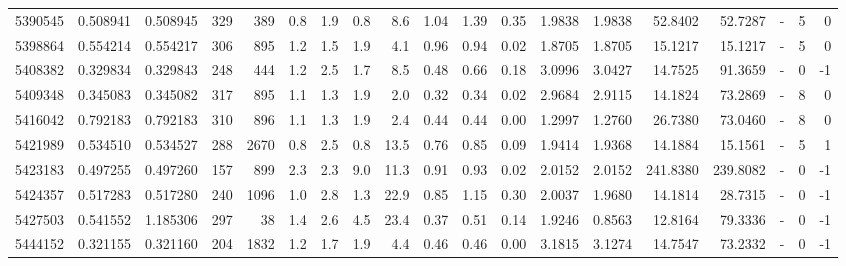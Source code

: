 \begin{tabular}{rrrrrrrrrrrrrrrrlrr}
   5390545 & 0.508941 &   0.508945 &  329 &  389 &      0.8 &      1.9 &     0.8 &      8.6 &       1.04 &        1.39 &        0.35 &  1.9838 &  1.9838 &   52.8402 &   52.7287 &             - &        5 &          0 \\
   5398864 & 0.554214 &   0.554217 &  306 &  895 &      1.2 &      1.5 &     1.9 &      4.1 &       0.96 &        0.94 &        0.02 &  1.8705 &  1.8705 &   15.1217 &   15.1217 &             - &        5 &          0 \\
   5408382 & 0.329834 &   0.329843 &  248 &  444 &      1.2 &      2.5 &     1.7 &      8.5 &       0.48 &        0.66 &        0.18 &  3.0996 &  3.0427 &   14.7525 &   91.3659 &             - &        0 &         -1 \\
   5409348 & 0.345083 &   0.345082 &  317 &  895 &      1.1 &      1.3 &     1.9 &      2.0 &       0.32 &        0.34 &        0.02 &  2.9684 &  2.9115 &   14.1824 &   73.2869 &             - &        8 &          0 \\
   5416042 & 0.792183 &   0.792183 &  310 &  896 &      1.1 &      1.3 &     1.9 &      2.4 &       0.44 &        0.44 &        0.00 &  1.2997 &  1.2760 &   26.7380 &   73.0460 &             - &        8 &          0 \\
   5421989 & 0.534510 &   0.534527 &  288 & 2670 &      0.8 &      2.5 &     0.8 &     13.5 &       0.76 &        0.85 &        0.09 &  1.9414 &  1.9368 &   14.1884 &   15.1561 &             - &        5 &          1 \\
   5423183 & 0.497255 &   0.497260 &  157 &  899 &      2.3 &      2.3 &     9.0 &     11.3 &       0.91 &        0.93 &        0.02 &  2.0152 &  2.0152 &  241.8380 &  239.8082 &             - &        0 &         -1 \\
   5424357 & 0.517283 &   0.517280 &  240 & 1096 &      1.0 &      2.8 &     1.3 &     22.9 &       0.85 &        1.15 &        0.30 &  2.0037 &  1.9680 &   14.1814 &   28.7315 &             - &        0 &         -1 \\
   5427503 & 0.541552 &   1.185306 &  297 &   38 &      1.4 &      2.6 &     4.5 &     23.4 &       0.37 &        0.51 &        0.14 &  1.9246 &  0.8563 &   12.8164 &   79.3336 &             - &        0 &         -1 \\
   5444152 & 0.321155 &   0.321160 &  204 & 1832 &      1.2 &      1.7 &     1.9 &      4.4 &       0.46 &        0.46 &        0.00 &  3.1815 &  3.1274 &   14.7547 &   73.2332 &             - &        0 &         -1 \\

\end{tabular}
